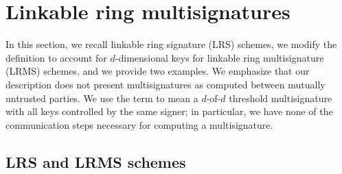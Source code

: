 \documentclass{mrl}
\theoremstyle{plain}
\theoremstyle{definition}
\begin{document}
\section{Linkable ring multisignatures}

In this section, we recall linkable ring signature (LRS) schemes, we modify the definition to account for $d$-dimensional keys for linkable ring multisignature (LRMS) schemes, and we provide two examples. We emphasize that our description does not present multisignatures as computed between mutually untrusted parties. We use the term to mean a $d$-of-$d$ threshold multisignature with all keys controlled by the same signer; in particular, we have none of the communication steps necessary for computing a multisignature.


\subsection{LRS and LRMS schemes}
\end{document}
